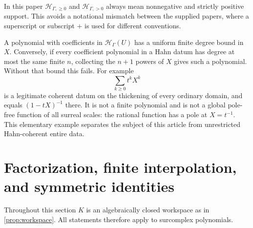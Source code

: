 \documentclass[11pt,letterpaper]{article}
\numberwithin{equation}{section}
\theoremstyle{definition}
\theoremstyle{remark}
\newcommand{\HH}{\mathcal H_\Gamma}
\begin{document}
In this paper $\mathcal H_{\Gamma,\ge0}$ and
$\mathcal H_{\Gamma,>0}$ always mean nonnegative and strictly positive
support. This avoids a notational mismatch between the supplied papers,
where a superscript or subscript $+$ is used for different conventions.

A polynomial with coefficients in $\HH(U)$ has a uniform finite degree
bound in $X$. Conversely, if every coefficient polynomial in a Hahn datum
has degree at most the same finite $n$, collecting the $n+1$ powers of $X$
gives such a polynomial. Without that bound this fails. For example
\begin{equation}\label{eq:geometricwarning}
 \sum_{k\ge0}t^kX^k
\end{equation}
is a legitimate coherent datum on the thickening of every ordinary domain,
and equals $(1-tX)^{-1}$ there. It is not a finite polynomial and is not
a global pole-free function of all surreal scales: the rational function
has a pole at $X=t^{-1}$. This elementary example separates the subject of
this article from unrestricted Hahn-coherent entire data.

\section{Factorization, finite interpolation, and symmetric identities}\label{sec:finitealgebra}
Throughout this section $K$ is an algebraically closed workspace as in
\cref{prop:workspace}. All statements therefore apply to surcomplex
polynomials.
\end{document}
